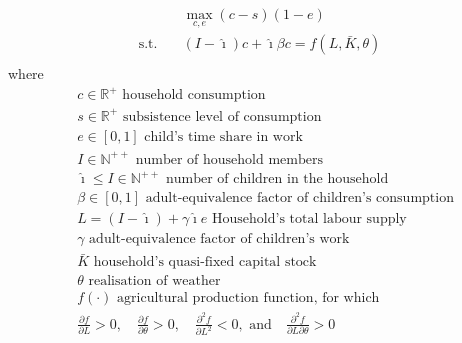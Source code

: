 \documentclass[a4paper,12pt]{article}
\theoremstyle{plain}
\theoremstyle{definition}
\theoremstyle{definition}
\theoremstyle{definition}
\theoremstyle{definition}
\begin{document}
\begin{align*}
    &\max_{c, e} (c-s)(1-e)\\
    \text{s.t.} \quad &(I-\hat{\imath})c+\hat{\imath}\beta c = f(L, \bar{K}, \theta)\\
\end{align*}
where
\begin{align*}
    &c \in \mathbb{R}^+ \text{ household consumption} \\
    &s \in \mathbb{R}^+ \text{ subsistence level of consumption} \\
    &e \in [0,1] \text{ child's time share in work} \\
    &I \in \mathbb{N}^{++} \text{ number of household members} \\
    &\hat{\imath} \leq I \in \mathbb{N}^{++} \text{ number of children in the household} \\
    &\beta \in [0,1] \text{ adult-equivalence factor of children's consumption} \\
    &L = (I-\hat{\imath})+ \gamma \hat{\imath}e \text{ Household's total labour supply} \\
    &\gamma \text{ adult-equivalence factor of children's work} \\
    &\bar{K} \text{ household's quasi-fixed capital stock} \\
    &\theta \text{ realisation of weather} \\
    &f(\cdot) \text{ agricultural production function, for which}\\
    &\frac{\partial f}{\partial L}>0, \quad \frac{\partial f}{\partial \theta}>0, \quad \frac{\partial^2 f}{\partial L^2}<0, \text{ and} \quad \frac{\partial^2 f}{\partial L \partial \theta}>0\\
\end{align*}
\end{document}
